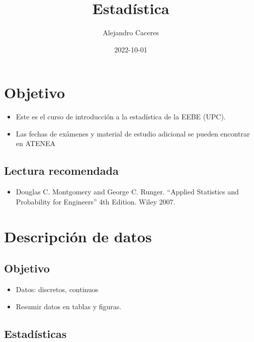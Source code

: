 \documentclass[
]{book}
\title{Estadística}
\author{Alejandro Caceres}
\date{2022-10-01}
\providecommand{\tightlist}{%
  \setlength{\itemsep}{0pt}\setlength{\parskip}{0pt}}
\begin{document}
\maketitle

{
\setcounter{tocdepth}{1}
\tableofcontents
}
\hypertarget{objetivo}{%
\chapter{Objetivo}\label{objetivo}}

\begin{itemize}
\item
  Este es el curso de introducción a la estadística de la EEBE (UPC).
\item
  Las fechas de exámenes y material de estudio adicional se pueden encontrar en ATENEA
\end{itemize}

\hypertarget{lectura-recomendada}{%
\section{Lectura recomendada}\label{lectura-recomendada}}

\begin{itemize}
\tightlist
\item
  Douglas C. Montgomery and George C. Runger. ``Applied Statistics and Probability for Engineers'' 4th Edition. Wiley 2007.
\end{itemize}

\hypertarget{descripciuxf3n-de-datos}{%
\chapter{Descripción de datos}\label{descripciuxf3n-de-datos}}

\hypertarget{objetivo-1}{%
\section{Objetivo}\label{objetivo-1}}

\begin{itemize}
\tightlist
\item
  Datos: discretos, continuos
\item
  Resumir datos en tablas y figuras.
\end{itemize}

\hypertarget{estaduxedsticas}{%
\section{Estadísticas}\label{estaduxedsticas}}
\end{document}
